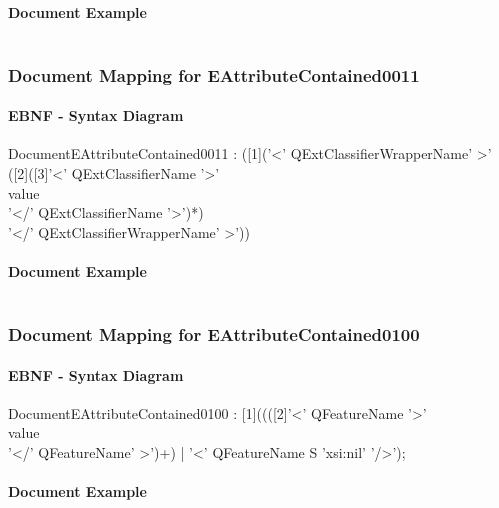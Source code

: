 \documentclass[11pt,a4paper]{article}
\begin{document}
\paragraph{Document Example}
\inputminted[fontsize=\footnotesize]{xml}{examples/EAttributeContained0010.xml}

\subsubsection{Document Mapping for EAttributeContained0011}
\paragraph{EBNF - Syntax Diagram}
\begin{rail}
DocumentEAttributeContained0011 :
([1]('<' QExtClassifierWrapperName' >'\\
([2]([3]'<' QExtClassifierName '>' \\
value \\
'</' QExtClassifierName '>')*) \\
'</' QExtClassifierWrapperName' >'))
\end{rail}

\paragraph{Document Example}
\inputminted[fontsize=\footnotesize]{xml}{examples/EAttributeContained0011.xml}


\subsubsection{Document Mapping for EAttributeContained0100}
\paragraph{EBNF - Syntax Diagram}
\begin{rail}
DocumentEAttributeContained0100 : [1]((([2]'<' QFeatureName '>' \\
value \\ 
'</' QFeatureName' >')+) 
| '<' QFeatureName S 'xsi:nil' '/>'); 
\end{rail}

\paragraph{Document Example}
\inputminted[fontsize=\footnotesize]{xml}{examples/EAttributeContained0100.xml}
\end{document}
